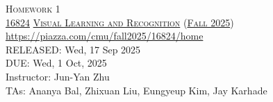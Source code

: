 \documentclass[11pt,addpoints,answers]{exam}
\title{\textsc{\hwName}} %
\author{}
\date{}
\date{}
\numberwithin{equation}{section} %
\numberwithin{figure}{section} %
\numberwithin{table}{section} %
\newcommand{\courseNum}{\href{https://visual-learning.cs.cmu.edu/}{16824}}
\newcommand{\courseName}{\href{https://visual-learning.cs.cmu.edu/}{Visual Learning and Recognition}}
\newcommand{\courseSem}{\href{https://visual-learning.cs.cmu.edu/}{Fall 2025}}
\newcommand{\courseUrl}{{\url{https://piazza.com/cmu/fall2025/16824/home}}}
\newcommand{\hwNum}{Homework 1}
\newcommand{\hwTopic}{Image Classification and Object Detection}
\newcommand{\outDate}{{Wed, 17 Sep 2025}}
\newcommand{\dueDate}{{Wed, 1 Oct, 2025}}
\newcommand{\instructorName}{{Jun-Yan Zhu}}
\newcommand{\taNames}{{Ananya Bal, Zhixuan Liu, Eungyeup Kim, Jay Karhade}}
\begin{document}
\section*{}
\begin{center}
  \textsc{\LARGE \hwNum} \\
  \vspace{1em}
  \textsc{\large \courseNum{} \courseName{} (\courseSem)} \\
  \courseUrl\\
  \vspace{1em}
  RELEASED: \outDate \\
  DUE: \dueDate \\
  Instructor: \instructorName \\
  TAs: \taNames
\end{center}
\end{document}
